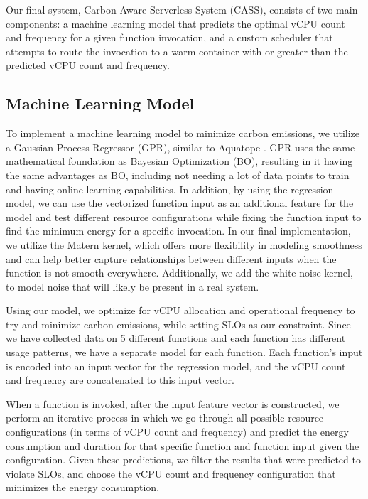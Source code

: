 \documentclass[times, 10pt,twocolumn]{article}
\begin{document}
Our final system, Carbon Aware Serverless System (CASS), consists of two main components: a machine learning model that predicts the optimal vCPU count and frequency for a given function invocation, and a custom scheduler that attempts to route the invocation to a warm container with or greater than the predicted vCPU count and frequency.

\subsection{Machine Learning Model}
To implement a machine learning model to minimize carbon emissions, we utilize a Gaussian Process Regressor (GPR), similar to Aquatope  \cite{aquatope}. GPR uses the same mathematical foundation as Bayesian Optimization (BO), resulting in it having the same advantages as BO, including not needing a lot of data points to train and having online learning capabilities. In addition, by using the regression model, we can use the vectorized function input as an additional feature for the model and test different resource configurations while fixing the function input to find the minimum energy for a specific invocation. In our final implementation, we utilize the Matern kernel, which offers more flexibility in modeling smoothness and can help better capture relationships between different inputs when the function is not smooth everywhere. Additionally, we add the white noise kernel, to model noise that will likely be present in a real system. 

Using our model, we optimize for vCPU allocation and operational frequency to try and minimize carbon emissions, while setting SLOs as our constraint. Since we have collected data on 5 different functions and each function has different usage patterns, we have a separate model for each function. Each function's input is encoded into an input vector for the regression model, and the vCPU count and frequency are concatenated to this input vector.

When a function is invoked, after the input feature vector is constructed, we perform an iterative process in which we go through all possible resource configurations (in terms of vCPU count and frequency) and predict the energy consumption and duration for that specific function and function input given the configuration. Given these predictions, we filter the results that were predicted to violate SLOs, and choose the vCPU count and frequency configuration that minimizes the energy consumption. 
\end{document}
